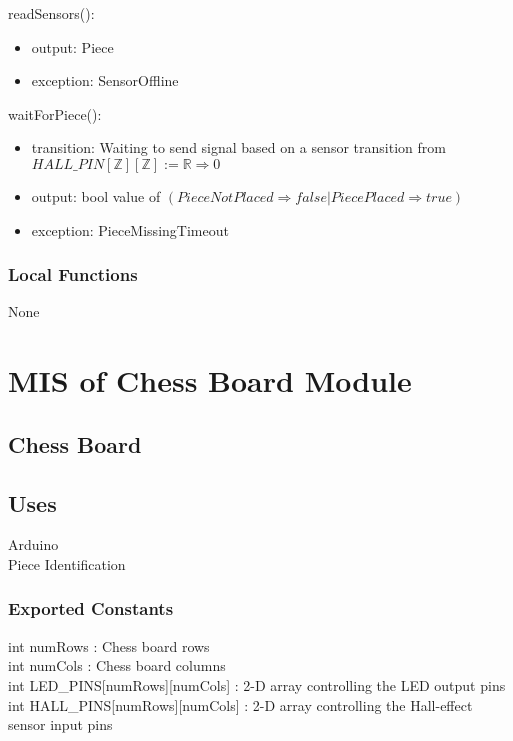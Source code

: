 \documentclass[12pt, titlepage]{article}
\begin{document}
\noindent readSensors():
\begin{itemize}
\item output: Piece
\item exception: SensorOffline
\end{itemize}

\noindent waitForPiece():
\begin{itemize}
\item transition: Waiting to send signal based on a sensor transition from\\$HALL\_PIN[\mathbb{Z}][\mathbb{Z}] := \mathbb{R} \Rightarrow 0$
\item output: bool value of $(Piece Not Placed \Rightarrow false | Piece Placed \Rightarrow true)$
\item exception: PieceMissingTimeout
\end{itemize}

\subsubsection{Local Functions}{
  None
}

\newpage

\section{MIS of Chess Board Module} \label{ChessBoardModule} 

\subsection{Chess Board}

\subsection{Uses}
Arduino\\
Piece Identification\\

\subsubsection{Exported Constants}{
int numRows : Chess board rows \\
int numCols : Chess board columns \\
int LED\_PINS[numRows][numCols] : 2-D array controlling the LED output pins \\
int HALL\_PINS[numRows][numCols] : 2-D array controlling the Hall-effect sensor input pins \\
}
\end{document}
